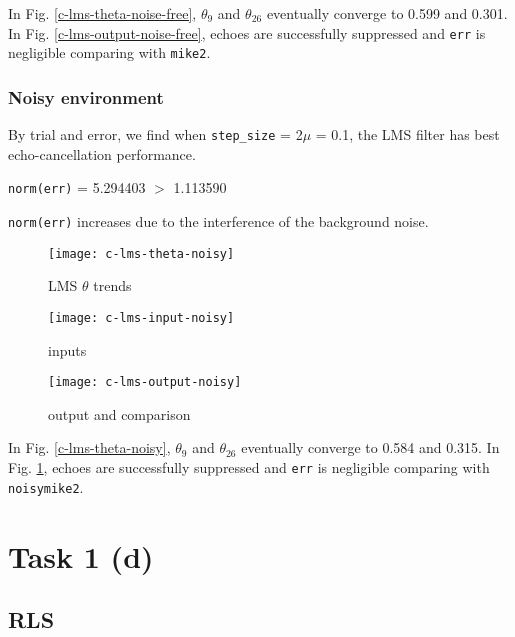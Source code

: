 \documentclass{article}
\begin{document}
In Fig. \ref{c-lms-theta-noise-free}, $\theta_9$ and $\theta_{26}$ eventually converge to 0.599 and 0.301. In Fig. \ref{c-lms-output-noise-free}, echoes are successfully suppressed and \texttt{err} is negligible comparing with \texttt{mike2}.


\subsubsection*{Noisy environment}

By trial and error, we find when \texttt{step\_size} = 2$\mu$ = 0.1, the LMS filter has best echo-cancellation performance.
\begin{center}
\texttt{norm(err)} = 5.294403 $>$ 1.113590
\end{center}
\texttt{norm(err)} increases due to the interference of the background noise.

\begin{figure}[H]
\begin{minipage}[t]{0.33\linewidth}
\centering
\texttt{[image: c-lms-theta-noisy]}
\caption{LMS $\theta$ trends}
\label{c-lms-theta-noisy}
\end{minipage}
\begin{minipage}[t]{0.33\linewidth}
\centering
\texttt{[image: c-lms-input-noisy]}
\caption{inputs}
\end{minipage}
\begin{minipage}[t]{0.33\linewidth}
\centering
\texttt{[image: c-lms-output-noisy]}
\caption{output and comparison}
\label{c-lms-output-noisy}
\end{minipage}
\end{figure}

In Fig. \ref{c-lms-theta-noisy}, $\theta_9$ and $\theta_{26}$ eventually converge to 0.584 and 0.315. In Fig. \ref{c-lms-output-noisy}, echoes are successfully suppressed and \texttt{err} is negligible comparing with \texttt{noisymike2}.


\section*{Task 1 (d)}

\subsection*{RLS}
\end{document}
